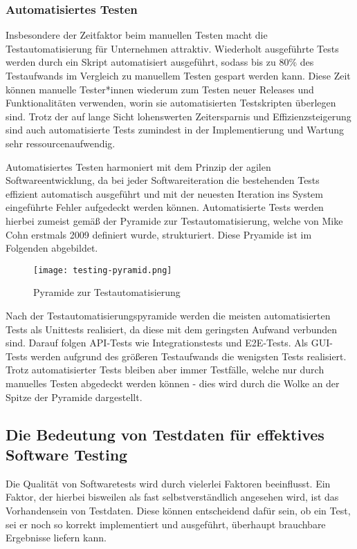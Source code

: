 \subsubsection*{Automatisiertes Testen}\label{subsubsec:autotest}
Insbesondere der Zeitfaktor beim manuellen Testen macht die Testautomatisierung für Unternehmen attraktiv. Wiederholt ausgeführte Tests werden durch ein Skript automatisiert ausgeführt, sodass bis zu 80\% des Testaufwands im Vergleich zu manuellem Testen gespart werden kann. \cite[S. 3]{fewster:1999} Diese Zeit können manuelle Tester*innen wiederum zum Testen neuer Releases und Funktionalitäten verwenden, worin sie automatisierten Testskripten überlegen sind. \cite[S. 231]{witte:2019} Trotz der auf lange Sicht lohenswerten Zeitersparnis und Effizienzsteigerung sind auch automatisierte Tests zumindest in der Implementierung und Wartung sehr ressourcenaufwendig. \cite[S. 5]{fewster:1999}

Automatisiertes Testen harmoniert mit dem Prinzip der agilen Softwareentwicklung, da bei jeder Softwareiteration die bestehenden Tests effizient automatisch ausgeführt und mit der neuesten Iteration ins System eingeführte Fehler aufgedeckt werden können. \cite{contan:2018} \cite{fewster:1999} Automatisierte Tests werden hierbei zumeist gemäß der Pyramide zur Testautomatisierung, welche von Mike Cohn erstmals 2009 definiert wurde, strukturiert. \cite{cohn:2010} Diese Pryamide ist im Folgenden abgebildet.

\begin{figure}[h]
    \centering
    \texttt{[image: testing-pyramid.png]}
    \caption{Pyramide zur Testautomatisierung}
\end{figure}

Nach der Testautomatisierungspyramide werden die meisten automatisierten Tests als Unittests realisiert, da diese mit dem geringsten Aufwand verbunden sind. Darauf folgen \ac{API}-Tests wie Integrationstests und \ac{E2E}-Tests. Als \ac{GUI}-Tests werden aufgrund des größeren Testaufwands die wenigsten Tests realisiert. Trotz automatisierter Tests bleiben aber immer Testfälle, welche nur durch manuelles Testen abgedeckt werden können - dies wird durch die Wolke an der Spitze der Pyramide dargestellt.

\subsection{Die Bedeutung von Testdaten für effektives Software Testing}\label{subsec:testdaten}
Die Qualität von Softwaretests wird durch vielerlei Faktoren beeinflusst. Ein Faktor, der hierbei bisweilen als fast selbstverständlich angesehen wird, ist das Vorhandensein von Testdaten. Diese können entscheidend dafür sein, ob ein Test, sei er noch so korrekt implementiert und ausgeführt, überhaupt brauchbare Ergebnisse liefern kann.

